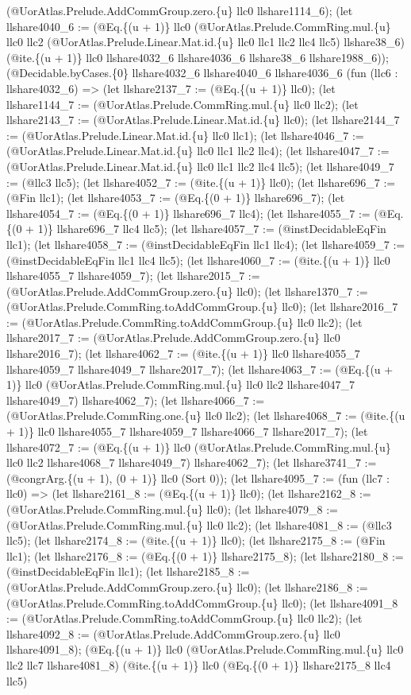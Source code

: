 \documentclass[11pt]{article}
\begin{document}
(@UorAtlas.Prelude.AddCommGroup.zero.\{u\} llc0 llshare1114\_6); (let llshare4040\_6 := (@Eq.\{(u + 1)\} llc0 (@UorAtlas.Prelude.CommRing.mul.\{u\} llc0 llc2 (@UorAtlas.Prelude.Linear.Mat.id.\{u\} llc0 llc1 llc2 llc4 llc5) llshare38\_6) (@ite.\{(u + 1)\} llc0 llshare4032\_6 llshare4036\_6 llshare38\_6 llshare1988\_6)); (@Decidable.byCases.\{0\} llshare4032\_6 llshare4040\_6 llshare4036\_6 (fun (llc6 : llshare4032\_6) => (let llshare2137\_7 := (@Eq.\{(u + 1)\} llc0); (let llshare1144\_7 := (@UorAtlas.Prelude.CommRing.mul.\{u\} llc0 llc2); (let llshare2143\_7 := (@UorAtlas.Prelude.Linear.Mat.id.\{u\} llc0); (let llshare2144\_7 := (@UorAtlas.Prelude.Linear.Mat.id.\{u\} llc0 llc1); (let llshare4046\_7 := (@UorAtlas.Prelude.Linear.Mat.id.\{u\} llc0 llc1 llc2 llc4); (let llshare4047\_7 := (@UorAtlas.Prelude.Linear.Mat.id.\{u\} llc0 llc1 llc2 llc4 llc5); (let llshare4049\_7 := (@llc3 llc5); (let llshare4052\_7 := (@ite.\{(u + 1)\} llc0); (let llshare696\_7 := (@Fin llc1); (let llshare4053\_7 := (@Eq.\{(0 + 1)\} llshare696\_7); (let llshare4054\_7 := (@Eq.\{(0 + 1)\} llshare696\_7 llc4); (let llshare4055\_7 := (@Eq.\{(0 + 1)\} llshare696\_7 llc4 llc5); (let llshare4057\_7 := (@instDecidableEqFin llc1); (let llshare4058\_7 := (@instDecidableEqFin llc1 llc4); (let llshare4059\_7 := (@instDecidableEqFin llc1 llc4 llc5); (let llshare4060\_7 := (@ite.\{(u + 1)\} llc0 llshare4055\_7 llshare4059\_7); (let llshare2015\_7 := (@UorAtlas.Prelude.AddCommGroup.zero.\{u\} llc0); (let llshare1370\_7 := (@UorAtlas.Prelude.CommRing.toAddCommGroup.\{u\} llc0); (let llshare2016\_7 := (@UorAtlas.Prelude.CommRing.toAddCommGroup.\{u\} llc0 llc2); (let llshare2017\_7 := (@UorAtlas.Prelude.AddCommGroup.zero.\{u\} llc0 llshare2016\_7); (let llshare4062\_7 := (@ite.\{(u + 1)\} llc0 llshare4055\_7 llshare4059\_7 llshare4049\_7 llshare2017\_7); (let llshare4063\_7 := (@Eq.\{(u + 1)\} llc0 (@UorAtlas.Prelude.CommRing.mul.\{u\} llc0 llc2 llshare4047\_7 llshare4049\_7) llshare4062\_7); (let llshare4066\_7 := (@UorAtlas.Prelude.CommRing.one.\{u\} llc0 llc2); (let llshare4068\_7 := (@ite.\{(u + 1)\} llc0 llshare4055\_7 llshare4059\_7 llshare4066\_7 llshare2017\_7); (let llshare4072\_7 := (@Eq.\{(u + 1)\} llc0 (@UorAtlas.Prelude.CommRing.mul.\{u\} llc0 llc2 llshare4068\_7 llshare4049\_7) llshare4062\_7); (let llshare3741\_7 := (@congrArg.\{(u + 1), (0 + 1)\} llc0 (Sort 0)); (let llshare4095\_7 := (fun (llc7 : llc0) => (let llshare2161\_8 := (@Eq.\{(u + 1)\} llc0); (let llshare2162\_8 := (@UorAtlas.Prelude.CommRing.mul.\{u\} llc0); (let llshare4079\_8 := (@UorAtlas.Prelude.CommRing.mul.\{u\} llc0 llc2); (let llshare4081\_8 := (@llc3 llc5); (let llshare2174\_8 := (@ite.\{(u + 1)\} llc0); (let llshare2175\_8 := (@Fin llc1); (let llshare2176\_8 := (@Eq.\{(0 + 1)\} llshare2175\_8); (let llshare2180\_8 := (@instDecidableEqFin llc1); (let llshare2185\_8 := (@UorAtlas.Prelude.AddCommGroup.zero.\{u\} llc0); (let llshare2186\_8 := (@UorAtlas.Prelude.CommRing.toAddCommGroup.\{u\} llc0); (let llshare4091\_8 := (@UorAtlas.Prelude.CommRing.toAddCommGroup.\{u\} llc0 llc2); (let llshare4092\_8 := (@UorAtlas.Prelude.AddCommGroup.zero.\{u\} llc0 llshare4091\_8); (@Eq.\{(u + 1)\} llc0 (@UorAtlas.Prelude.CommRing.mul.\{u\} llc0 llc2 llc7 llshare4081\_8) (@ite.\{(u + 1)\} llc0 (@Eq.\{(0 + 1)\} llshare2175\_8 llc4 llc5) 
\end{document}
